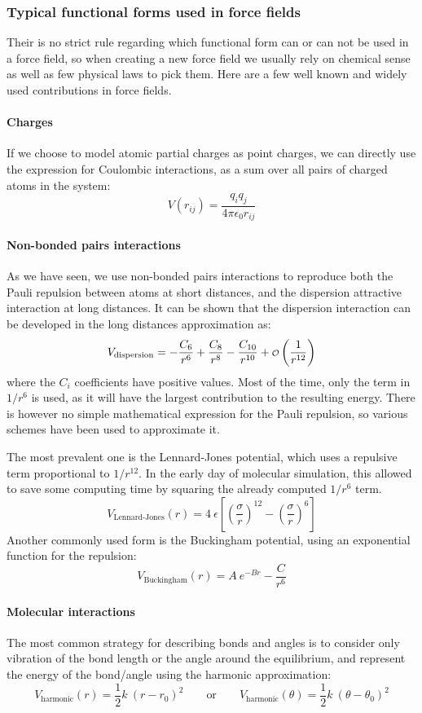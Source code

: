 \documentclass[thesis]{subfiles}
\begin{document}
\subsubsection{Typical functional forms used in force fields}

Their is no strict rule regarding which functional form can or can not be used
in a force field, so when creating a new force field we usually rely on
chemical sense as well as few physical laws to pick them. Here are a few well
known and widely used contributions in force fields.

\paragraph{Charges} If we choose to model atomic partial charges as point
charges, we can directly use the expression for Coulombic interactions, as a sum
over all pairs of charged atoms in the system:
\[ V(r_{ij}) = \frac{q_i q_j}{4 \pi \epsilon_0 r_{ij}}\]

\paragraph{Non-bonded pairs interactions} As we have seen, we use non-bonded
pairs interactions to reproduce both the Pauli repulsion between atoms at short
distances, and the dispersion attractive interaction at long distances. It can
be shown\cite{London1930} that the dispersion interaction can be developed in
the long distances approximation as:
\[ V_\text{dispersion} = -\frac{C_6}{r^6} + \frac{C_8}{r^8} - \frac{C_{10}}{r^{10}} + {\scriptstyle\mathcal{O}}\left(\frac{1}{r^{12}}\right) \]
where the $C_i$ coefficients have positive values. Most of the time, only the
term in $1/r^6$ is used, as it will have the largest contribution to the
resulting energy. There is however no simple mathematical expression for the
Pauli repulsion, so various schemes have been used to approximate it.

The most prevalent one is the Lennard-Jones potential, which uses a repulsive
term proportional to $1/r^{12}$. In the early day of molecular simulation, this
allowed to save some computing time by squaring the already computed $1/r^6$ term.
\[V_\text{Lennard-Jones}(r) = 4 \ \epsilon \left[\left(\frac{\sigma}{r}\right)^{12} - \left(\frac{\sigma}{r}\right)^6\right]\]
Another commonly used form is the Buckingham potential, using an exponential
function for the repulsion:
\[V_\text{Buckingham}(r) = A \ e^{-B r} - \frac{C}{r^6}\]

\paragraph{Molecular interactions} The most common strategy for describing bonds
and angles is to consider only vibration of the bond length or the angle around
the equilibrium, and represent the energy of the bond/angle using the harmonic
approximation:
\[V_\text{harmonic}(r) = \frac 12 k \ (r - r_0)^2  \qquad\text{or}\qquad V_\text{harmonic}(\theta) = \frac 12 k \ (\theta - \theta_0)^2 \]
\end{document}
